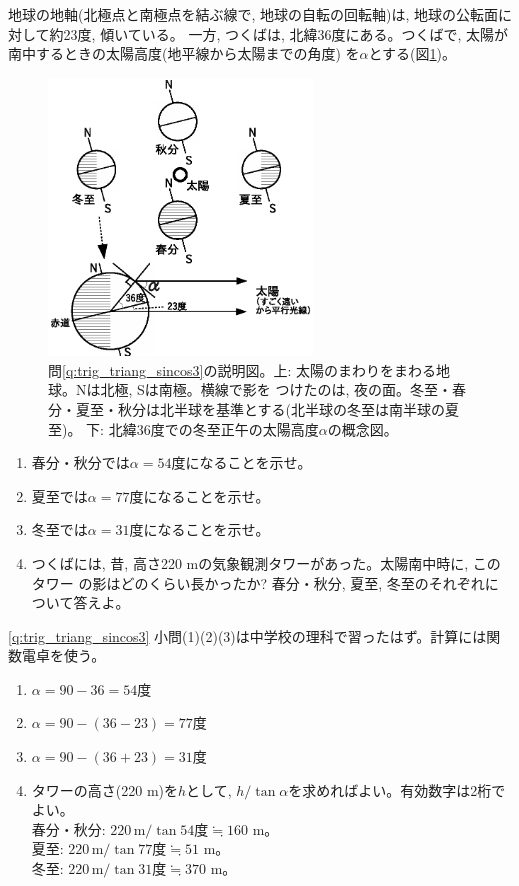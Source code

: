 \begin{q}\label{q:trig_triang_sincos3} 
地球の地軸(北極点と南極点を結ぶ線で, 地球の自転の回転軸)は, 地球の公転面に対して約23度, 傾いている。
一方, つくばは, 北緯36度にある。つくばで, 太陽が南中するときの太陽高度(地平線から太陽までの角度)
を$\alpha$とする(図\ref{fig:sun_angle})。
\begin{figure}[h]
    \centering
    \includegraphics[width=7cm]{sun_angle.eps}
    \caption{問\ref{q:trig_triang_sincos3}の説明図。上: 太陽のまわりをまわる地球。Nは北極, Sは南極。横線で影を
つけたのは, 夜の面。冬至・春分・夏至・秋分は北半球を基準とする(北半球の冬至は南半球の夏至)。
下: 北緯36度での冬至正午の太陽高度$\alpha$の概念図。}\label{fig:sun_angle}
\end{figure}
\begin{enumerate}
\item 春分・秋分では$\alpha=54$度になることを示せ。
\item 夏至では$\alpha=77$度になることを示せ。
\item 冬至では$\alpha=31$度になることを示せ。
\item つくばには, 昔, 高さ220 mの気象観測タワーがあった。太陽南中時に, このタワー
の影はどのくらい長かったか? 春分・秋分, 夏至, 冬至のそれぞれについて答えよ。
\end{enumerate}\end{q}

\ref{q:trig_triang_sincos3} 小問(1)(2)(3)は中学校の理科で習ったはず。計算には関数電卓を使う。
\begin{enumerate}
\item $\alpha=90-36=54$度
\item $\alpha=90-(36-23)=77$度
\item $\alpha=90-(36+23)=31$度
\item タワーの高さ(220$\,\,$m)を$h$として, $h/\tan\alpha$を求めればよい。有効数字は2桁でよい。\\
春分・秋分: $220\,\text{m}/\tan 54\text{度}\fallingdotseq160$ m。\\
夏至: $220\,\text{m}/\tan 77\text{度}\fallingdotseq51$ m。\\
冬至: $220\,\text{m}/\tan 31\text{度}\fallingdotseq370$ m。
\end{enumerate}
\mv






